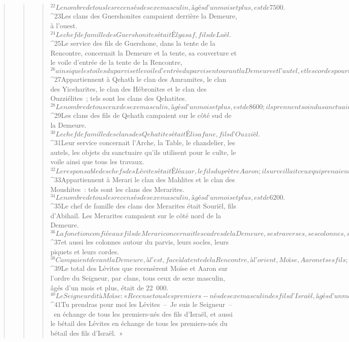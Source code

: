 \begin{verse}
\begin{verse}
\begin{verse}
${}^{22}Le nombre de tous les recensés de sexe masculin, âgés d’un mois et plus, est de 7 500. 
${}^{23}Les clans des Guershonites campaient derrière la Demeure, à l’ouest. 
${}^{24}Le chef de famille des Guershonites était Élyasaf, fils de Laël. 
${}^{25}Le service des fils de Guershone, dans la tente de la Rencontre, concernait la Demeure et la tente, sa couverture et le voile d’entrée de la tente de la Rencontre, 
${}^{26}ainsi que les toiles du parvis et le voile d’entrée du parvis entourant la Demeure et l’autel, et les cordes pour tous les travaux.
${}^{27}Appartiennent à Qehath le clan des Amramites, le clan des Yiceharites, le clan des Hébronites et le clan des Ouzziélites ; tels sont les clans des Qehatites. 
${}^{28}Le nombre de tous ceux de sexe masculin, âgés d’un mois et plus, est de 8 600 ; ils prennent soin du sanctuaire. 
${}^{29}Les clans des fils de Qehath campaient sur le côté sud de la Demeure. 
${}^{30}Le chef de famille des clans des Qehatites était Élisafane, fils d’Ouzziël. 
${}^{31}Leur service concernait l’Arche, la Table, le chandelier, les autels, les objets du sanctuaire qu’ils utilisent pour le culte, le voile ainsi que tous les travaux. 
${}^{32}Le responsable des chefs des Lévites était Éléazar, le fils du prêtre Aaron ; il surveillait ceux qui prenaient soin du sanctuaire.
${}^{33}Appartiennent à Merari le clan des Mahlites et le clan des Moushites : tels sont les clans des Merarites. 
${}^{34}Le nombre de tous les recensés de sexe masculin, âgés d’un mois et plus, est de 6 200. 
${}^{35}Le chef de famille des clans des Merarites était Souriël, fils d’Abihaïl. Les Merarites campaient sur le côté nord de la Demeure. 
${}^{36}La fonction confiée aux fils de Merari concernait les cadres de la Demeure, ses traverses, ses colonnes, ses socles, tous ses objets ainsi que tous les travaux, 
${}^{37}et aussi les colonnes autour du parvis, leurs socles, leurs piquets et leurs cordes. 
${}^{38}Campaient devant la Demeure, à l’est, face à la tente de la Rencontre, à l’orient, Moïse, Aaron et ses fils ; ils prenaient soin du sanctuaire, ils en prenaient soin au nom des fils d’Israël. Le profane qui approchera sera mis à mort.
${}^{39}Le total des Lévites que recensèrent Moïse et Aaron sur l’ordre du Seigneur, par clans, tous ceux de sexe masculin, âgés d’un mois et plus, était de 22 000.
${}^{40}Le Seigneur dit à Moïse : « Recense tous les premiers-nés de sexe masculin des fils d’Israël, âgés d’un mois et plus, et fais le relevé de leurs noms. 
${}^{41}Tu prendras pour moi les Lévites – Je suis le Seigneur – en échange de tous les premiers-nés des fils d’Israël, et aussi le bétail des Lévites en échange de tous les premiers-nés du bétail des fils d’Israël. » 

\end{verse}
\end{verse}
\end{verse}

